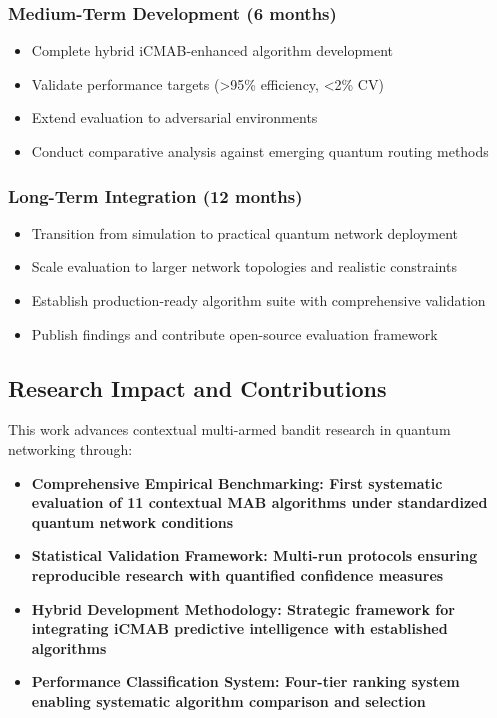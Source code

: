 \documentclass[12pt,a4paper]{article}
\newcommand{\performance}[1]{\textcolor{performancecolor}{\textbf{#1}}}
\newcommand{\stochastic}[1]{\textcolor{stochasticcolor}{\textbf{#1}}}
\newcommand{\success}[1]{\textcolor{successcolor}{\textbf{#1}}}
\newcommand{\hybrid}[1]{\textcolor{hybridcolor}{\textbf{#1}}}
\begin{document}
\subsubsection{Medium-Term Development (6 months)}
\begin{itemize}
\item Complete hybrid iCMAB-enhanced algorithm development
\item Validate performance targets (>95\% efficiency, <2\% CV)
\item Extend evaluation to adversarial environments
\item Conduct comparative analysis against emerging quantum routing methods
\end{itemize}

\subsubsection{Long-Term Integration (12 months)}
\begin{itemize}
\item Transition from simulation to practical quantum network deployment
\item Scale evaluation to larger network topologies and realistic constraints
\item Establish production-ready algorithm suite with comprehensive validation
\item Publish findings and contribute open-source evaluation framework
\end{itemize}

\subsection{Research Impact and Contributions}

This work advances contextual multi-armed bandit research in quantum networking through:

\begin{itemize}
\item \performance{\textbf{Comprehensive Empirical Benchmarking}: First systematic evaluation of 11 contextual MAB algorithms under standardized quantum network conditions}
\item \success{\textbf{Statistical Validation Framework}: Multi-run protocols ensuring reproducible research with quantified confidence measures}
\item \hybrid{\textbf{Hybrid Development Methodology}: Strategic framework for integrating iCMAB predictive intelligence with established algorithms}
\item \stochastic{\textbf{Performance Classification System}: Four-tier ranking system enabling systematic algorithm comparison and selection}
\end{itemize}
\end{document}
